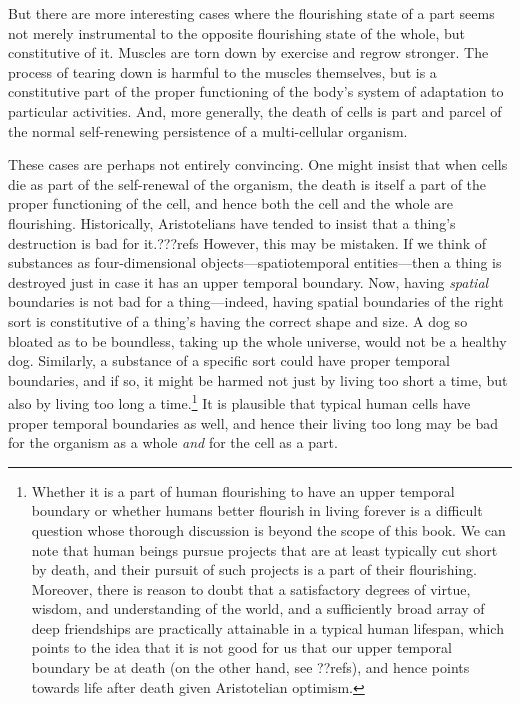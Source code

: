 But there are more interesting cases where the flourishing state of a part seems not merely instrumental to 
the opposite flourishing state of the whole, but constitutive of it. Muscles are torn down by exercise
and regrow stronger. The process of tearing down is harmful to the muscles themselves, but is a constitutive 
part of the proper functioning of the body's system of adaptation to particular activities. And, more
generally, the death of cells is part and parcel of the normal self-renewing persistence of a multi-cellular
organism.

These cases are perhaps not entirely convincing. One might insist that when cells die as part of the self-renewal
of the organism, the death is itself a part of the proper functioning of the cell, and hence both the cell and the
whole are flourishing. Historically, Aristotelians have tended to insist that a thing's destruction is bad
for it.???refs However, this may be mistaken. If we think of substances as four-dimensional objects---spatiotemporal
entities---then a thing is destroyed just in case it has an upper temporal boundary. Now, having \textit{spatial} 
boundaries is not bad for a thing---indeed, having spatial boundaries of the right sort is constitutive of a thing's
having the correct shape and size. A dog so bloated as to be boundless, taking up the whole universe, would not be a 
healthy dog. Similarly, a substance of a specific sort could have proper temporal boundaries, and if so, it might be harmed not just by
living too short a time, but also by living too long a time.\footnote{
Whether it is a part of human flourishing to have an upper temporal boundary or whether humans better flourish
in living forever is a difficult
question whose thorough discussion is beyond the scope of this book. We can note that human beings 
pursue projects that  are at least typically cut short by death, and their pursuit of such projects 
is a part of their flourishing. Moreover, there is reason to doubt that a satisfactory degrees of virtue, wisdom, 
and understanding of the world, and a sufficiently broad array of deep friendships are practically 
attainable in a typical human lifespan, which points to the idea that it is not good for us that our upper
temporal boundary be at death (on the
other hand, see ??refs), and hence points towards life after death given Aristotelian optimism.} It is plausible that typical human cells have 
proper temporal boundaries as well, and hence their living too long may be bad for the organism as a whole
\textit{and} for the cell as a part.

